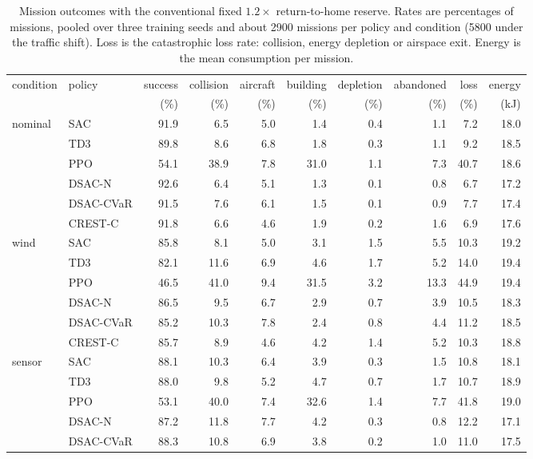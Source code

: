 \begin{table}[tb]
\centering
\caption{Mission outcomes with the conventional fixed $1.2\times$ return-to-home reserve. Rates are percentages of missions, pooled over three training seeds and about 2900 missions per policy and condition (5800 under the traffic shift). Loss is the catastrophic loss rate: collision, energy depletion or airspace exit. Energy is the mean consumption per mission.}
\label{tab:main}
\small
\begin{tabular}{llrrrrrrrr}
\toprule
condition & policy & success & collision & aircraft & building & depletion & abandoned & loss & energy \\
 &  & (\%) & (\%) & (\%) & (\%) & (\%) & (\%) & (\%) & (kJ) \\
\midrule
nominal & SAC & 91.9 & 6.5 & 5.0 & 1.4 & 0.4 & 1.1 & 7.2 & 18.0 \\
 & TD3 & 89.8 & 8.6 & 6.8 & 1.8 & 0.3 & 1.1 & 9.2 & 18.5 \\
 & PPO & 54.1 & 38.9 & 7.8 & 31.0 & 1.1 & 7.3 & 40.7 & 18.6 \\
 & DSAC-N & 92.6 & 6.4 & 5.1 & 1.3 & 0.1 & 0.8 & 6.7 & 17.2 \\
 & DSAC-CVaR & 91.5 & 7.6 & 6.1 & 1.5 & 0.1 & 0.9 & 7.7 & 17.4 \\
 & CREST-C & 91.8 & 6.6 & 4.6 & 1.9 & 0.2 & 1.6 & 6.9 & 17.6 \\
\addlinespace[2pt]
wind & SAC & 85.8 & 8.1 & 5.0 & 3.1 & 1.5 & 5.5 & 10.3 & 19.2 \\
 & TD3 & 82.1 & 11.6 & 6.9 & 4.6 & 1.7 & 5.2 & 14.0 & 19.4 \\
 & PPO & 46.5 & 41.0 & 9.4 & 31.5 & 3.2 & 13.3 & 44.9 & 19.4 \\
 & DSAC-N & 86.5 & 9.5 & 6.7 & 2.9 & 0.7 & 3.9 & 10.5 & 18.3 \\
 & DSAC-CVaR & 85.2 & 10.3 & 7.8 & 2.4 & 0.8 & 4.4 & 11.2 & 18.5 \\
 & CREST-C & 85.7 & 8.9 & 4.6 & 4.2 & 1.4 & 5.2 & 10.3 & 18.8 \\
\addlinespace[2pt]
sensor & SAC & 88.1 & 10.3 & 6.4 & 3.9 & 0.3 & 1.5 & 10.8 & 18.1 \\
 & TD3 & 88.0 & 9.8 & 5.2 & 4.7 & 0.7 & 1.7 & 10.7 & 18.9 \\
 & PPO & 53.1 & 40.0 & 7.4 & 32.6 & 1.4 & 7.7 & 41.8 & 19.0 \\
 & DSAC-N & 87.2 & 11.8 & 7.7 & 4.2 & 0.3 & 0.8 & 12.2 & 17.1 \\
 & DSAC-CVaR & 88.3 & 10.8 & 6.9 & 3.8 & 0.2 & 1.0 & 11.0 & 17.5 \\

\end{tabular}
\end{table}
